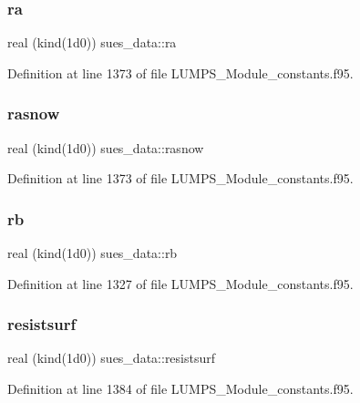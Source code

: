 \subsubsection{\texorpdfstring{ra}{ra}}
{\footnotesize\ttfamily real (kind(1d0)) sues\+\_\+data\+::ra}



Definition at line 1373 of file L\+U\+M\+P\+S\+\_\+\+Module\+\_\+constants.\+f95.

\mbox{\label{namespacesues__data_a2a84935439f246e72f5de7bd752888f1}} 
\subsubsection{\texorpdfstring{rasnow}{rasnow}}
{\footnotesize\ttfamily real (kind(1d0)) sues\+\_\+data\+::rasnow}



Definition at line 1373 of file L\+U\+M\+P\+S\+\_\+\+Module\+\_\+constants.\+f95.

\mbox{\label{namespacesues__data_a90293da57db1b1a3a4bc0979d2005640}} 
\subsubsection{\texorpdfstring{rb}{rb}}
{\footnotesize\ttfamily real (kind(1d0)) sues\+\_\+data\+::rb}



Definition at line 1327 of file L\+U\+M\+P\+S\+\_\+\+Module\+\_\+constants.\+f95.

\mbox{\label{namespacesues__data_a678cac1e19ddb70f811693772c031f0c}} 
\subsubsection{\texorpdfstring{resistsurf}{resistsurf}}
{\footnotesize\ttfamily real (kind(1d0)) sues\+\_\+data\+::resistsurf}



Definition at line 1384 of file L\+U\+M\+P\+S\+\_\+\+Module\+\_\+constants.\+f95.

